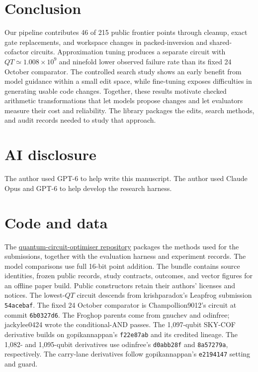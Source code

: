 \documentclass[aps,prx,reprint,raggedbottom,superscriptaddress,longbibliography,floatfix]{revtex4-2}
\newcommand{\code}[1]{\texttt{#1}}
\begin{document}
\section{Conclusion}
Our pipeline contributes 46 of 215 public frontier points through cleanup, exact gate replacements, and workspace changes in packed-inversion and shared-cofactor circuits.
Approximation tuning produces a separate circuit with $QT\simeq1.008\times10^9$ and ninefold lower observed failure rate than its fixed 24 October comparator.
The controlled search study shows an early benefit from model guidance within a small edit space, while fine-tuning exposes difficulties in generating usable code changes.
Together, these results motivate checked arithmetic transformations that let models propose changes and let evaluators measure their cost and reliability.
The library packages the edits, search methods, and audit records needed to study that approach.

\section*{AI disclosure}
The author used GPT-6 to help write this manuscript.
The author used Claude Opus and GPT-6 to help develop the research harness.

\section*{Code and data}
The \href{https://github.com/SnehalRaj/quantum-circuit-optimiser}{quantum-circuit-optimiser repository} packages the methods used for the submissions, together with the evaluation harness and experiment records.
The model comparisons use full 16-bit point addition.
The bundle contains source identities, frozen public records, study contracts, outcomes, and vector figures for an offline paper build.
Public constructors retain their authors' licenses and notices.
The lowest-$QT$ circuit descends from \mbox{krishparadox's} Leapfrog submission \code{54acebaf}.
The fixed 24 October comparator is Champollion9012's circuit at commit \code{6b0327d6}.
The Froghop parents come from gnuchev and odinfree; jackylee0424 wrote the conditional-AND passes.
The 1,097-qubit SKY-COF derivative builds on gopikannappan's \code{f22e87ab} and its credited lineage.
The 1,082- and 1,095-qubit derivatives use odinfree's \code{d0abb28f} and \code{8a57279a}, respectively.
The carry-lane derivatives follow gopikannappan's \code{e2194147} setting and guard.
\end{document}
